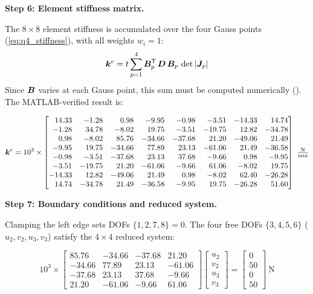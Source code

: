 \begin{example}
\medskip
\noindent\textbf{Step 6: Element stiffness matrix.}

The $8\times8$ element stiffness is accumulated over the four Gauss points
(\cref{eq:q4_stiffness}), with all weights $w_i = 1$:
\[
    \bm{k}^e = t\sum_{p=1}^{4} \bm{B}_p^{\mathsf{T}}\,\bm{D}\,\bm{B}_p\,
    \det|\bm{J}_p|
\]
Since $\bm{B}$ varies at each Gauss point, this sum must be computed
numerically (). The MATLAB-verified result is:

\begin{equation}
    \matr{k}^e = 10^3\times
    \begin{bmatrix*}[r]
         14.33 &  -1.28 &   0.98 &  -9.95 &  -0.98 &  -3.51 & -14.33 &  14.74 \\
         -1.28 &  34.78 &  -8.02 &  19.75 &  -3.51 & -19.75 &  12.82 & -34.78 \\
          0.98 &  -8.02 &  85.76 & -34.66 & -37.68 &  21.20 & -49.06 &  21.49 \\
         -9.95 &  19.75 & -34.66 &  77.89 &  23.13 & -61.06 &  21.49 & -36.58 \\
         -0.98 &  -3.51 & -37.68 &  23.13 &  37.68 &  -9.66 &   0.98 &  -9.95 \\
         -3.51 & -19.75 &  21.20 & -61.06 &  -9.66 &  61.06 &  -8.02 &  19.75 \\
        -14.33 &  12.82 & -49.06 &  21.49 &   0.98 &  -8.02 &  62.40 & -26.28 \\
         14.74 & -34.78 &  21.49 & -36.58 &  -9.95 &  19.75 & -26.28 &  51.60
    \end{bmatrix*}\ \tfrac{\text{N}}{\text{mm}}
    \label{eq:ke_q4_cook}
\end{equation}

\medskip
\noindent\textbf{Step 7: Boundary conditions and reduced system.}

Clamping the left edge sets DOFs $\{1,2,7,8\} = 0$. The four free DOFs
$\{3,4,5,6\}$ ($u_2,v_2,u_3,v_3$) satisfy the $4\times4$ reduced system:

\begin{equation}
    10^3\times
    \begin{bmatrix}
         85.76 & -34.66 & -37.68 &  21.20 \\
        -34.66 &  77.89 &  23.13 & -61.06 \\
        -37.68 &  23.13 &  37.68 &  -9.66 \\
         21.20 & -61.06 &  -9.66 &  61.06
    \end{bmatrix}
    \begin{bmatrix} u_2 \\ v_2 \\ u_3 \\ v_3 \end{bmatrix}
    =
    \begin{bmatrix} 0 \\ 50 \\ 0 \\ 50 \end{bmatrix}\ \text{N}
    \label{eq:Kff_q4}
\end{equation}


\end{example}
